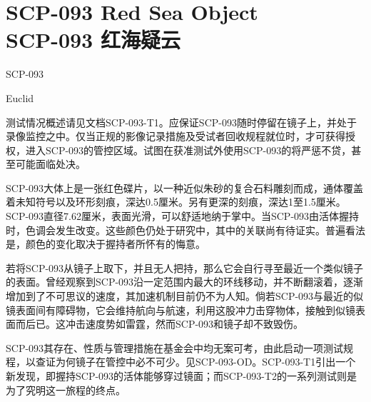 \chapter[SCP-093 红海疑云]{
    SCP-093 Red Sea Object\\
    SCP-093 红海疑云\\
    \heritage
}

\label{chap:SCP-093}

SCP-093

Euclid

测试情况概述请见文档SCP-093-T1。应保证SCP-093随时停留在镜子上，并处于录像监控之中。仅当正规的影像记录措施及受试者回收规程就位时，才可获得授权，进入SCP-093的管控区域。试图在获准测试外使用SCP-093的将严惩不贷，甚至可能面临处决。

SCP-093大体上是一张红色碟片，以一种近似朱砂的复合石料雕刻而成，通体覆盖着未知符号以及环形刻痕，深达0.5厘米。另有更深的刻痕，深达1至1.5厘米。SCP-093直径7.62厘米，表面光滑，可以舒适地纳于掌中。当SCP-093由活体握持时，色调会发生改变。这些颜色仍处于研究中，其中的关联尚有待证实。普遍看法是，颜色的变化取决于握持者所怀有的悔意。

若将SCP-093从镜子上取下，并且无人把持，那么它会自行寻至最近一个类似镜子的表面。曾经观察到SCP-093沿一定范围内最大的环线移动，并不断翻滚着，逐渐增加到了不可思议的速度，其加速机制目前仍不为人知。倘若SCP-093与最近的似镜表面间有障碍物，它会维持航向与航速，利用这股冲力击穿物体，接触到似镜表面而后已。这冲击速度势如雷霆，然而SCP-093和镜子却不致毁伤。

SCP-093其存在、性质与管理措施在基金会中均无案可考，由此启动一项测试规程，以查证为何镜子在管控中必不可少。见SCP-093-OD。SCP-093-T1引出一个新发现，即握持SCP-093的活体能够穿过镜面；而SCP-093-T2的一系列测试则是为了究明这一旅程的终点。

\begin{scpdialog}
\end{scpdialog}

